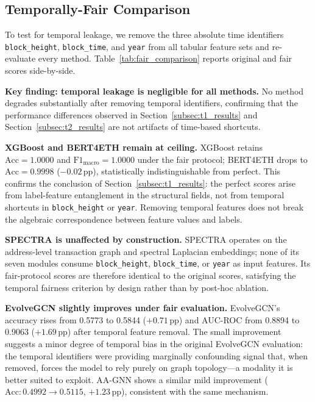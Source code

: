 
\subsection{Temporally-Fair Comparison}
\label{subsec:fair_results}

To test for temporal leakage, we remove the three absolute time identifiers
\texttt{block\_height}, \texttt{block\_time}, and \texttt{year} from all
tabular feature sets and re-evaluate every method.
Table~\ref{tab:fair_comparison} reports original and fair scores side-by-side.

\textbf{Key finding: temporal leakage is negligible for all methods.}
No method degrades substantially after removing temporal identifiers,
confirming that the performance differences observed in
Section~\ref{subsec:t1_results} and Section~\ref{subsec:t2_results}
are not artifacts of time-based shortcuts.

\textbf{XGBoost and BERT4ETH remain at ceiling.}
XGBoost retains $\text{Acc} = \num{1.0000}$ and $\text{F1}_{\text{macro}} = \num{1.0000}$
under the fair protocol; BERT4ETH drops to $\text{Acc} = \num{0.9998}$
($-\num{0.02}$\,pp), statistically indistinguishable from perfect.
This confirms the conclusion of Section~\ref{subsec:t1_results}: the
perfect scores arise from label-feature entanglement in the structural
fields, not from temporal shortcuts in \texttt{block\_height} or
\texttt{year}.
Removing temporal features does not break the algebraic correspondence
between feature values and labels.

\textbf{SPECTRA is unaffected by construction.}
SPECTRA operates on the address-level transaction graph and spectral
Laplacian embeddings; none of its seven modules consume \texttt{block\_height},
\texttt{block\_time}, or \texttt{year} as input features.
Its fair-protocol scores are therefore identical to the original scores,
satisfying the temporal fairness criterion by design rather than by
post-hoc ablation.

\textbf{EvolveGCN slightly improves under fair evaluation.}
EvolveGCN's accuracy rises from \num{0.5773} to \num{0.5844}
($+\num{0.71}$\,pp) and AUC-ROC from \num{0.8894} to \num{0.9063}
($+\num{1.69}$\,pp) after temporal feature removal.
The small improvement suggests a minor degree of temporal bias in the
original EvolveGCN evaluation: the temporal identifiers were providing
marginally confounding signal that, when removed, forces the model to
rely purely on graph topology---a modality it is better suited to exploit.
AA-GNN shows a similar mild improvement ($\text{Acc}: \num{0.4992} \to
\num{0.5115}$, $+\num{1.23}$\,pp), consistent with the same mechanism.

